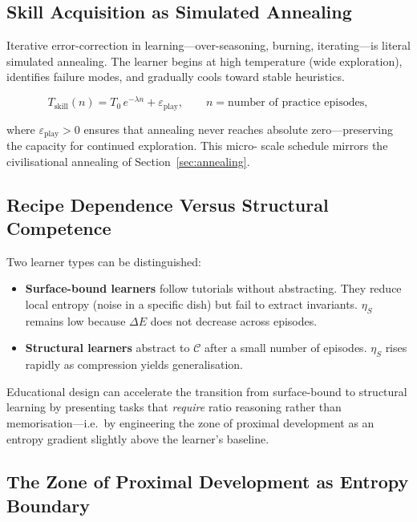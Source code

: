 \documentclass[12pt,a4paper]{article}
\theoremstyle{definition}
\begin{document}
\subsection{Skill Acquisition as Simulated Annealing}

Iterative error-correction in learning---over-seasoning, burning, iterating---is
literal simulated annealing.  The learner begins at high temperature
(wide exploration), identifies failure modes, and gradually cools toward stable
heuristics.

\begin{equation}
  T_{\mathrm{skill}}(n) = T_0\,e^{-\lambda n} + \varepsilon_{\mathrm{play}},
  \qquad n = \text{number of practice episodes},
\end{equation}

where $\varepsilon_{\mathrm{play}} > 0$ ensures that annealing never reaches
absolute zero---preserving the capacity for continued exploration.  This micro-
scale schedule mirrors the civilisational annealing of Section~\ref{sec:annealing}.

\subsection{Recipe Dependence Versus Structural Competence}

Two learner types can be distinguished:

\begin{itemize}[leftmargin=*]
  \item \textbf{Surface-bound learners} follow tutorials without abstracting.
    They reduce local entropy (noise in a specific dish) but fail to extract
    invariants.  $\eta_S$ remains low because $\Delta E$ does not decrease
    across episodes.
  \item \textbf{Structural learners} abstract to $\mathcal{C}$ after a small
    number of episodes.  $\eta_S$ rises rapidly as compression yields
    generalisation.
\end{itemize}

Educational design can accelerate the transition from surface-bound to
structural learning by presenting tasks that \emph{require} ratio reasoning
rather than memorisation---i.e.\ by engineering the zone of proximal
development as an entropy gradient slightly above the learner's baseline.

\subsection{The Zone of Proximal Development as Entropy Boundary}
\end{document}
